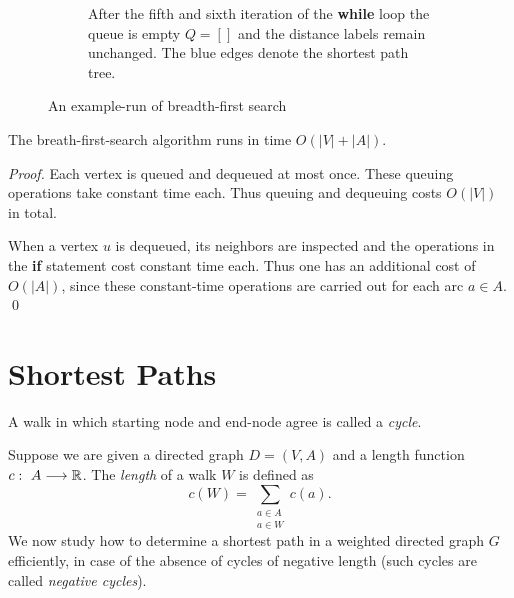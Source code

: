 \begin{figure}
\begin{subfigure}[t]{0.45\textwidth}
\caption{After the fifth and sixth iteration of the {\bf while} loop 
 the queue is empty $Q = []$ and the distance labels remain unchanged. 
 The blue edges denote the shortest path tree.}
\end{subfigure}
  


\caption{An example-run of breadth-first search}\label{g:fig:4}
\end{figure}





\begin{theorem}
  \label{f:thr:26}
  The breath-first-search algorithm runs in time $O( |V| + |A|)$. 
\end{theorem}

\begin{proof}
  Each vertex is queued and dequeued at most once. These queuing
  operations take constant time each. Thus queuing and dequeuing costs
  $O( |V| )$ in total. 

  When a vertex $u$ is dequeued, its neighbors are
  inspected and the operations in the {\bf if} statement cost constant
  time each. Thus one has an additional cost of $O( |A | )$, since
  these constant-time  operations are carried out for each arc $a \in
  A$. 
  \qed
\end{proof}

\section{Shortest Paths}
\label{sec:shortest-paths}

\begin{definition}[Cycle]
  A walk in which starting node and end-node agree is called a
  \emph{cycle}. 
\end{definition}

Suppose we are given a directed graph $D=(V,A)$ and a length function
$c:~A\longrightarrow\mathbb{R}$. The \emph{length} of a walk $W$ is defined as 
\begin{displaymath}
  c(W) = \sum_{\substack{a \in A\\ a\in W}}  c(a). 
\end{displaymath}
%
We now study how to determine a shortest path in a weighted directed
graph
$G$ efficiently, in case of the absence of cycles of negative length (such cycles are called \emph{negative cycles}). 

